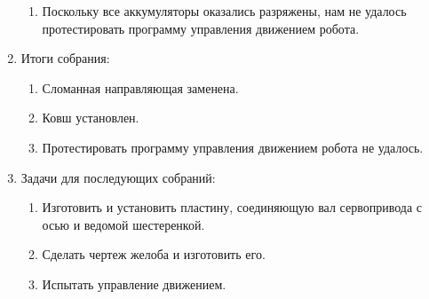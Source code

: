 \begin{enumerate}
\begin{enumerate}
        \item Поскольку все аккумуляторы оказались разряжены, нам не удалось протестировать программу управления движением робота.
        
	\end{enumerate}
	
	\item Итоги собрания:
	\begin{enumerate}
		
		\item Сломанная направляющая заменена.
		
        \item Ковш установлен.
        
        \item Протестировать программу управления движением робота не удалось.
		
	\end{enumerate}
	
	\item Задачи для последующих собраний:
	\begin{enumerate}
		
		\item Изготовить и установить пластину, соединяющую вал сервопривода с осью и ведомой шестеренкой.
		
		\item Сделать чертеж желоба и изготовить его.
		
        \item Испытать управление движением.
			
	\end{enumerate}
\end{enumerate}
\fillpage
